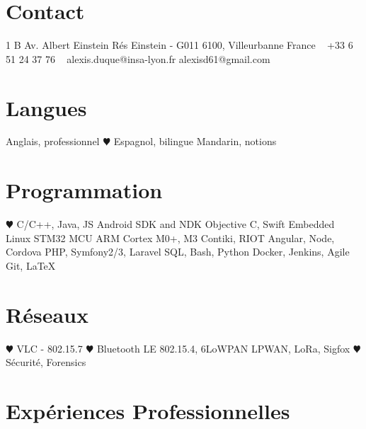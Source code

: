 \documentclass[]{cv-style}          %
\begin{document}
\lastupdated


\begin{aside}
%
\section{Contact}
1 B Av. Albert Einstein
Rés Einstein - G011
6100, Villeurbanne
France
~
+33 6 51 24 37 76
~
alexis.duque@insa-lyon.fr
alexisd61@gmail.com
%
\section{Langues}
Anglais, professionnel
{\color{red} $\varheartsuit$} Espagnol, bilingue
Mandarin, notions
%
\section{Programmation}
{\color{red} $\varheartsuit$} C/C++, Java, JS
Android SDK and NDK
Objective C, Swift
Embedded Linux
STM32 MCU
ARM Cortex M0+, M3
Contiki, RIOT
Angular, Node, Cordova
PHP, Symfony2/3, Laravel
SQL, Bash, Python
Docker, Jenkins, Agile
Git, \LaTeX{}
%
\section{Réseaux}
{\color{red} $\varheartsuit$} VLC - 802.15.7
{\color{red} $\varheartsuit$} Bluetooth LE
802.15.4, 6LoWPAN
LPWAN, LoRa, Sigfox
{\color{red} $\varheartsuit$} Sécurité, Forensics
\end{aside}



 \vspace{0.15cm}

\section{Expériences Professionnelles}
\end{document}
